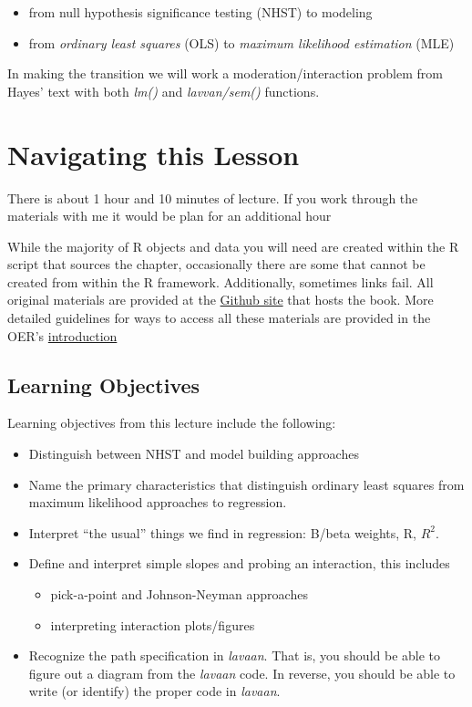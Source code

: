 \documentclass[
  english,
]{book}
\providecommand{\tightlist}{%
  \setlength{\itemsep}{0pt}\setlength{\parskip}{0pt}}
\begin{document}
\begin{itemize}
\tightlist
\item
  from null hypothesis significance testing (NHST) to modeling
\item
  from \emph{ordinary least squares} (OLS) to \emph{maximum likelihood estimation} (MLE)
\end{itemize}

In making the transition we will work a moderation/interaction problem from Hayes' text with both \emph{lm()} and \emph{lavvan/sem()} functions.

\hypertarget{navigating-this-lesson-7}{%
\section{Navigating this Lesson}\label{navigating-this-lesson-7}}

There is about 1 hour and 10 minutes of lecture. If you work through the materials with me it would be plan for an additional hour

While the majority of R objects and data you will need are created within the R script that sources the chapter, occasionally there are some that cannot be created from within the R framework. Additionally, sometimes links fail. All original materials are provided at the \href{https://github.com/lhbikos/ReC_MultivModel}{Github site} that hosts the book. More detailed guidelines for ways to access all these materials are provided in the OER's \protect\hyperlink{ReCintro}{introduction}

\hypertarget{learning-objectives-7}{%
\subsection{Learning Objectives}\label{learning-objectives-7}}

Learning objectives from this lecture include the following:

\begin{itemize}
\tightlist
\item
  Distinguish between NHST and model building approaches
\item
  Name the primary characteristics that distinguish ordinary least squares from maximum likelihood approaches to regression.
\item
  Interpret ``the usual'' things we find in regression: B/beta weights, R, \(R^{2}\).
\item
  Define and interpret simple slopes and probing an interaction, this includes

  \begin{itemize}
  \tightlist
  \item
    pick-a-point and Johnson-Neyman approaches
  \item
    interpreting interaction plots/figures
  \end{itemize}
\item
  Recognize the path specification in \emph{lavaan}. That is, you should be able to figure out a diagram from the \emph{lavaan} code. In reverse, you should be able to write (or identify) the proper code in \emph{lavaan}.
\end{itemize}
\end{document}
